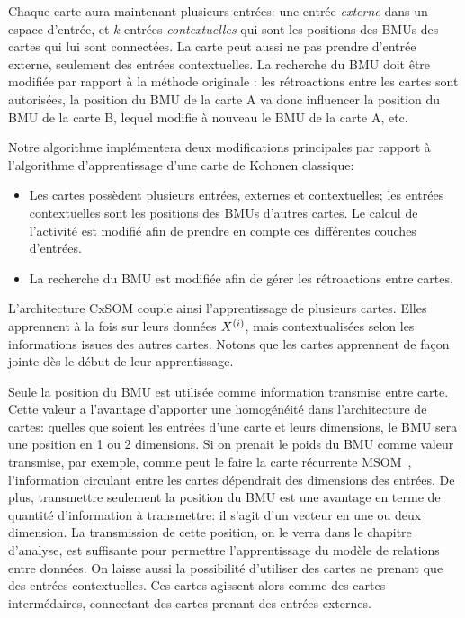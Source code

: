 \documentclass[../main]{subfiles}
\begin{document}
Chaque carte aura maintenant plusieurs entrées: une entrée \emph{externe} dans un espace d'entrée, et $k$ entrées \emph{contextuelles} qui sont les positions des BMUs des cartes qui lui sont connectées. La carte peut aussi ne pas prendre d'entrée externe, seulement des entrées contextuelles.
La recherche du BMU doit être modifiée par rapport à la méthode originale : les rétroactions entre les cartes sont autorisées, la position du BMU de la carte A va donc influencer la position du BMU de la carte B, lequel modifie à nouveau le BMU de la carte A, etc. 

Notre algorithme implémentera deux modifications principales par rapport à l'algorithme d'apprentissage d'une carte de Kohonen classique: 
\begin{itemize}
\item Les cartes possèdent plusieurs entrées, externes et contextuelles; les entrées contextuelles sont les positions des BMUs d'autres cartes. Le calcul de l'activité est modifié afin de prendre en compte ces différentes couches d'entrées.
\item La recherche du BMU est modifiée afin de gérer les rétroactions entre cartes.
\end{itemize}

L'architecture CxSOM couple ainsi l'apprentissage de plusieurs cartes. Elles apprennent à la fois sur leurs données $X^{({i})}$, mais contextualisées selon les informations issues des autres cartes. Notons que les cartes apprennent de façon jointe dès le début de leur apprentissage. 

Seule la position du BMU est utilisée comme information transmise entre carte. Cette valeur a l'avantage d'apporter une homogénéité dans l'architecture de cartes: quelles que soient les entrées d'une carte et leurs dimensions, le BMU sera une position en 1 ou 2 dimensions. Si on prenait le poids du BMU comme valeur transmise, par exemple, comme peut le faire la carte récurrente MSOM~\cite{Strickert2005MergeSF}, l'information circulant entre les cartes dépendrait des dimensions des entrées.
De plus, transmettre seulement la position du BMU est une avantage en terme de quantité d'information à transmettre: il s'agit d'un vecteur en une ou deux dimension. %
La transmission de cette position, on le verra dans le chapitre d'analyse, est suffisante pour permettre l'apprentissage du modèle de relations entre données.
On laisse aussi la possibilité d'utiliser des cartes ne prenant que des entrées contextuelles. Ces cartes agissent alors comme des cartes intermédaires, connectant des cartes prenant des entrées externes.
\end{document}
